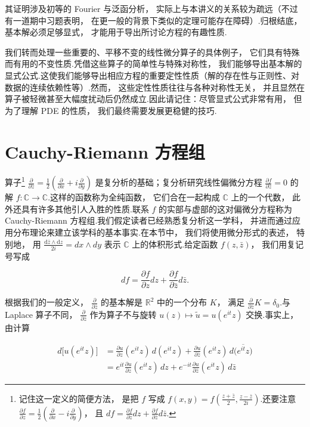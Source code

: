 其证明涉及初等的 Fourier 与泛函分析， 实际上与本讲义的关系较为疏远（不过有一道期中习题表明， 在更一般的背景下类似的定理可能存在障碍）.归根结底， 基本解必须足够显式， 才能用于导出所讨论方程的有趣性质.

我们转而处理一些重要的、平移不变的线性微分算子的具体例子， 它们具有特殊而有用的不变性质.凭借这些算子的简单性与特殊对称性， 我们能够导出基本解的显式公式.这使我们能够导出相应方程的重要定性性质（解的存在性与正则性、对数据的连续依赖性等）.然而， 这些定性性质往往与各种对称性无关， 并且显然在算子被轻微甚至大幅度扰动后仍然成立.因此请记住：尽管显式公式非常有用， 但为了理解 PDE 的性质， 我们最终需要发展更稳健的技巧.

\section{Cauchy-Riemann 方程组}

算子\footnote{记住这一定义的简便方法， 是把 $f$ 写成 $f(x, y) = f\!\left(\frac{z+\bar{z}}{2}, \frac{z-\bar{z}}{2i}\right)$.还要注意 $\frac{\partial f}{\partial z} = \frac{1}{2}\!\left(\frac{\partial}{\partial x} - i\frac{\partial}{\partial y}\right)$， 且 $df = \frac{\partial f}{\partial z}dz + \frac{\partial f}{\partial \bar{z}}d\bar{z}$.}
$\frac{\partial}{\partial \bar{z}} = \frac{1}{2}\!\left(\frac{\partial}{\partial x} + i\frac{\partial}{\partial y}\right)$ 是复分析的基础；复分析研究线性偏微分方程
$\frac{\partial f}{\partial \bar{z}} = 0$ 的解 $f : \mathbb{C} \to \mathbb{C}$.这样的函数称为全纯函数， 它们合在一起构成 $\mathbb{C}$ 上的一个代数， 此外还具有许多其他引人入胜的性质.联系 $f$ 的实部与虚部的这对偏微分方程称为 Cauchy-Riemann 方程组.我们假定读者已经熟悉复分析这一学科， 并进而通过应用分布理论来建立该学科的基本事实.在本节中， 我们将使用微分形式的表述， 特别地， 用 $\frac{\mathrm{d}\bar{z} \wedge \mathrm{d}z}{2i} = dx \wedge dy$ 表示 $\mathbb{C}$ 上的体积形式.给定函数 $f(z, \bar{z})$， 我们用复记号写成

\[
df = \frac{\partial f}{\partial z}dz + \frac{\partial f}{\partial \bar{z}}d\bar{z}.
\]

根据我们的一般定义， $\frac{\partial}{\partial \bar{z}}$ 的基本解是 $\mathbb{R}^{2}$ 中的一个分布 $K$， 满足 $\frac{\partial}{\partial \bar{z}}K = \delta_{0}$.与 Laplace 算子不同， $\frac{\partial}{\partial \bar{z}}$ 作为算子不与旋转 $u(z) \mapsto \tilde{u} = u(e^{it}z)$ 交换.事实上， 由计算

\[
\begin{aligned}
d\bigl[u(e^{it}z)\bigr] &= \frac{\partial u}{\partial z}(e^{it}z)\, d(e^{it}z) + \frac{\partial u}{\partial \bar{z}}(e^{it}z)\, d\bigl(\overline{e^{it}z}\bigr) \\
&= e^{it}\frac{\partial u}{\partial z}(e^{it}z)\, dz + e^{-it}\frac{\partial u}{\partial \bar{z}}(e^{it}z)\, d\bar{z}
\end{aligned}
\]

